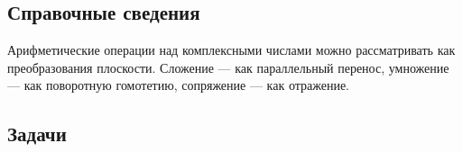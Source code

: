 \subsection*{Справочные сведения}


Арифметические операции над комплексными числами можно рассматривать как преобразования плоскости. Сложение --- как параллельный перенос, умножение --- как поворотную гомотетию, сопряжение --- как отражение.


\subsection*{Задачи}


